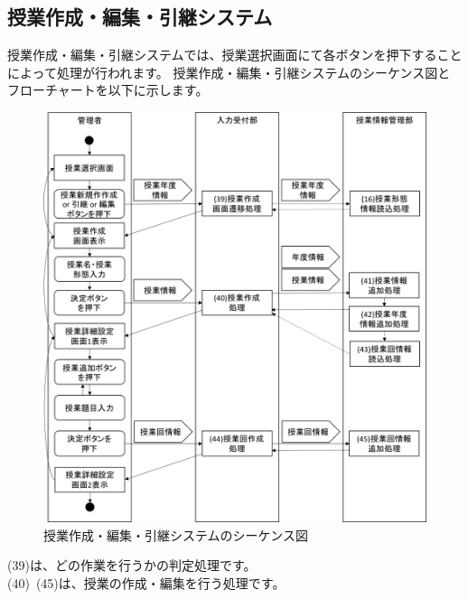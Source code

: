 \clearpage




\subsection{授業作成・編集・引継システム}
授業作成・編集・引継システムでは、授業選択画面にて各ボタンを押下することによって処理が行われます。
授業作成・編集・引継システムのシーケンス図とフローチャートを以下に示します。

\begin{figure}[htbp]
  \begin{center}
    \includegraphics[width=1\linewidth,clip]{./img/seq11.png}
    \caption{授業作成・編集・引継システムのシーケンス図}\label{fig:seq11}
  \end{center}
\end{figure}

(39)は、どの作業を行うかの判定処理です。\\
(40)~(45)は、授業の作成・編集を行う処理です。

